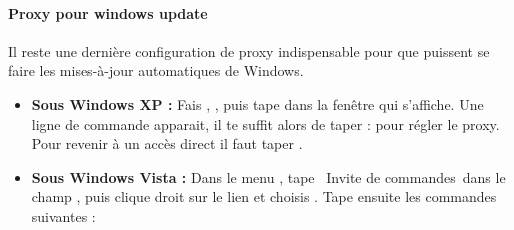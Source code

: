 \paragraph{Proxy pour windows update} Il reste une derni\`ere configuration de
proxy indispensable pour que puissent se faire les mises-\`a-jour automatiques
de Windows.

\begin{itemize}

\item \textbf{Sous Windows XP :} Fais , , puis
tape  dans la fen\^etre qui s'affiche. Une ligne de commande apparait,
il te suffit alors de taper :  pour r\'egler
le proxy. Pour revenir \`a un acc\`es direct il faut taper .

\item \textbf{Sous Windows Vista :}
Dans le menu , tape \guillemotleft~Invite de commandes~\guillemotright dans le champ , puis clique droit sur le lien
et choisis . Tape ensuite les commandes suivantes :

\noindent {}



\end{itemize}
